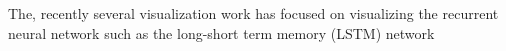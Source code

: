 The, recently several visualization work has focused on visualizing the recurrent neural network such as the long-short term memory (LSTM) network
